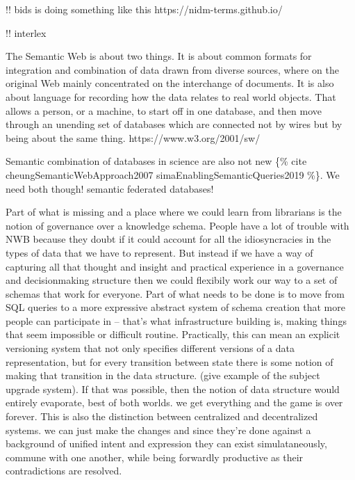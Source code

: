 \documentclass[nohyper]{tufte-book-jls}
\begin{document}
!! bids is doing something like this https://nidm-terms.github.io/

!! interlex

\begin{leftbar}
The Semantic Web is about two things. It is about common formats for
integration and combination of data drawn from diverse sources, where on
the original Web mainly concentrated on the interchange of documents. It
is also about language for recording how the data relates to real world
objects. That allows a person, or a machine, to start off in one
database, and then move through an unending set of databases which are
connected not by wires but by being about the same thing.
https://www.w3.org/2001/sw/
\end{leftbar}

Semantic combination of databases in science are also not new \{\% cite
cheungSemanticWebApproach2007 simaEnablingSemanticQueries2019 \%\}. We
need both though! semantic federated databases!

Part of what is missing and a place where we could learn from librarians
is the notion of governance over a knowledge schema. People have a lot
of trouble with NWB because they doubt if it could account for all the
idiosyncracies in the types of data that we have to represent. But
instead if we have a way of capturing all that thought and insight and
practical experience in a governance and decisionmaking structure then
we could flexibily work our way to a set of schemas that work for
everyone. Part of what needs to be done is to move from SQL queries to a
more expressive abstract system of schema creation that more people can
participate in -- that's what infrastructure building is, making things
that seem impossible or difficult routine. Practically, this can mean an
explicit versioning system that not only specifies different versions of
a data representation, but for every transition between state there is
some notion of making that transition in the data structure. (give
example of the subject upgrade system). If that was possible, then the
notion of data structure would entirely evaporate, best of both worlds.
we get everything and the game is over forever. This is also the
distinction between centralized and decentralized systems. we can just
make the changes and since they're done against a background of unified
intent and expression they can exist simulataneously, commune with one
another, while being forwardly productive as their contradictions are
resolved.
\end{document}

